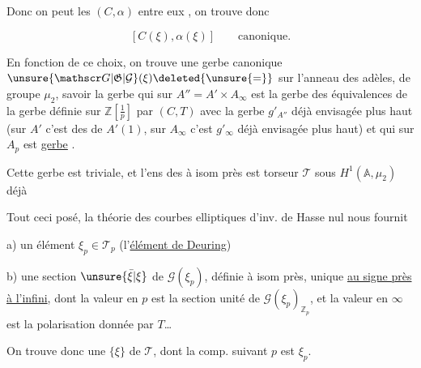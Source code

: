 
Donc on peut   les $(C,\alpha)$  entre
eux , on trouve donc

\[
[C(\xi),\alpha(\xi)]\qquad\text{canonique.}
\]


En fonction de ce choix, on trouve une gerbe
canonique $\unsure{\mathscr G|\mathfrak G|\mathcal G}(\xi)\deleted{\unsure{=}}$ sur l'anneau des adèles,
de groupe $\mu_2$, savoir la gerbe qui sur $A''=A'\times A_\infty$ est
la gerbe des équivalences  de la gerbe  
définie sur $\mathbb Z[\frac1p]$ par $(C,T)$  avec la gerbe
$g'_{A''}$ déjà envisagée plus haut (sur $A'$ c'est 
des \unsure{$\sqrt{\ }$} de $A'(1)$, sur $A_\infty$ c'est $g'_\infty$ déjà envisagée
plus haut) et qui sur $A_p$ est  \uline{gerbe} .

Cette gerbe est  triviale, et l'ens des  à isom
 près est  torseur $\mathcal T$ sous $H^1(\mathbb A,\mu_2)$ déjà


Tout ceci posé, la théorie  des courbes elliptiques
d'inv. de Hasse nul nous fournit

a) un élément $\xi_p\in\mathcal T_p$ (l'\uline{élément de Deuring})

b) une section  $\unsure{\bar\xi|\xi}$ de $\mathscr G(\xi_p)$, définie
à isom près, unique \uline{au signe près à l'infini},
dont la valeur en $p$  est la section unité
 de $\mathscr G(\xi_p)_{\mathbb Z_p}$, et la valeur en $\infty$ est la
polarisation donnée par $T$\ldots

On trouve donc une  $\{\xi\}$ de $\mathcal T$, dont la
comp. suivant $p$ est $\xi_p$.
